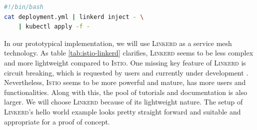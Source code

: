 \begin{lstlisting}[language=bash,caption={Injection of sidecards into a deployment in \textsc{Linkerd}}, label={lst:linkerd}]
#!/bin/bash
cat deployment.yml | linkerd inject - \
	| kubectl apply -f -
\end{lstlisting}

%
% 

In our prototypical implementation, we will use \textsc{Linkerd} as a service mesh technology. As table \ref{tab:istio-linkerd} clarifies, \textsc{Linkerd} seems to be less complex and more lightweight compared to \textsc{Istio}. One missing key feature of \textsc{Linkerd} is circuit breaking, which is requested by users and currently under development \cite{linkerd-circuit-breaker}. Nevertheless, \textsc{Istio} seems to be more powerful and mature, has more users and functionalities. Along with this, the pool of tutorials and documentation is also larger.
We will choose \textsc{Linkerd} because of its lightweight nature. The setup of \textsc{Linkerd}'s hello world example looks pretty straight forward and suitable and appropriate for a proof of concept.